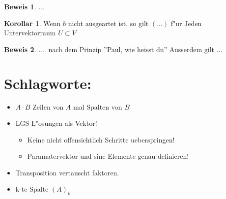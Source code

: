 \documentclass[oneside,fontsize=11pt,paper=a4,BCOR=0mm,DIV=12,automark,headsepline]{scrbook}
\theoremstyle{remark}
\theoremstyle{definition}
\newtheorem*{korollar}{Korollar}
\theoremstyle{definition}
\newtheorem*{prof}{Beweis}
\theoremstyle{remark}
\begin{document}
\begin{prof}
  ... 
\end{prof}

\begin{korollar}
  Wenn $b$ nicht ausgeartet ist, so gilt $(...)$ f"ur Jeden Untervektorraum
  $U\subset  V$
\end{korollar}
\begin{prof}
  .... nach dem Prinzip ''Paul, wie heisst du'' Ausserdem gilt ...
\end{prof}

\section{Schlagworte:}
\label{sec:orgcf8c685}
\begin{itemize}
\item \(A\cdot B\) Zeilen von \(A\) mal Spalten von \(B\)
\item LGS L"osungen als Vektor!
\begin{itemize}
\item Keine nicht offensichtlich Schritte ueberspringen!
\item Paramatervektor und sine Elemente genau definieren!
\end{itemize}
\item Transposition vertauscht faktoren.
\item k-te Spalte \((A)_k\)
\end{itemize}
\end{document}
